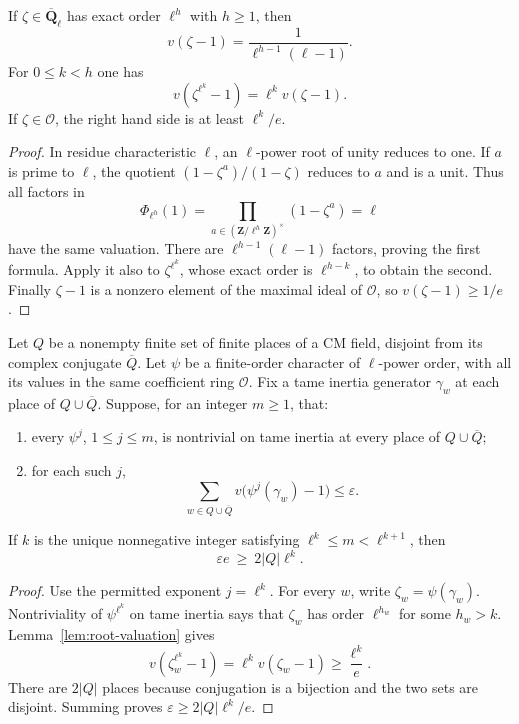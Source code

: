 \begin{lemma}
\label{lem:root-valuation}
If $\zeta\in\overline{\mathbf Q}_\ell$ has exact order $\ell^h$ with
$h\geq1$, then
\[
 v(\zeta-1)=\frac1{\ell^{h-1}(\ell-1)}.
\]
For $0\leq k<h$ one has
\[
 v(\zeta^{\ell^k}-1)=\ell^k v(\zeta-1).
\]
If $\zeta\in\mathcal O$, the right hand side is at least $\ell^k/e$.
\end{lemma}

\begin{proof}
In residue characteristic $\ell$, an $\ell$-power root of unity reduces
to one. If $a$ is prime to $\ell$, the quotient
$(1-\zeta^a)/(1-\zeta)$ reduces to $a$ and is a unit. Thus all factors in
\[
 \Phi_{\ell^h}(1)
 =\prod_{a\in(\mathbf Z/\ell^h\mathbf Z)^\times}(1-\zeta^a)=\ell
\]
have the same valuation. There are $\ell^{h-1}(\ell-1)$ factors,
proving the first formula. Apply it also to $\zeta^{\ell^k}$, whose
exact order is $\ell^{h-k}$, to obtain the second. Finally
$\zeta-1$ is a nonzero element of the maximal ideal of $\mathcal O$,
so $v(\zeta-1)\geq1/e$.
\end{proof}

\begin{theorem}
\label{thm:ramification-budget}
Let $Q$ be a nonempty finite set of finite places of a CM field, disjoint
from its complex conjugate $\overline Q$. Let $\psi$ be a finite-order
character of $\ell$-power order, with all its values in the same
coefficient ring $\mathcal O$. Fix a tame inertia generator $\gamma_w$
at each place of $Q\cup\overline Q$. Suppose, for an integer $m\geq1$,
that:
\begin{enumerate}
\item every $\psi^j$, $1\leq j\leq m$, is nontrivial on tame inertia
      at every place of $Q\cup\overline Q$;
\item for each such $j$,
\[
 \sum_{w\in Q\cup\overline Q}
       v\bigl(\psi^j(\gamma_w)-1\bigr)\leq\varepsilon.
\]
\end{enumerate}
If $k$ is the unique nonnegative integer satisfying
$\ell^k\leq m<\ell^{k+1}$, then
\begin{equation}\label{eq:epsilon-e-budget}
 \boxed{\quad \varepsilon e\ \geq\ 2|Q|\ell^k.\quad}
\end{equation}
\end{theorem}

\begin{proof}
Use the permitted exponent $j=\ell^k$. For every $w$, write
$\zeta_w=\psi(\gamma_w)$. Nontriviality of $\psi^{\ell^k}$ on tame
inertia says that $\zeta_w$ has order $\ell^{h_w}$ for some $h_w>k$.
Lemma~\ref{lem:root-valuation} gives
\[
 v(\zeta_w^{\ell^k}-1)
  =\ell^k v(\zeta_w-1)\geq\frac{\ell^k}{e}.
\]
There are $2|Q|$ places because conjugation is a bijection and the two
sets are disjoint. Summing proves
$\varepsilon\geq2|Q|\ell^k/e$.
\end{proof}

